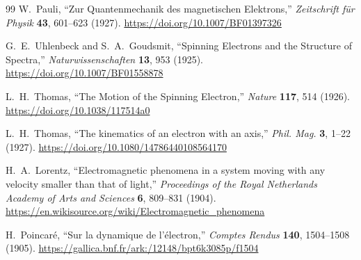 \documentclass[%
 reprint,
 amsmath,amssymb,
 aps,
]{revtex4-1}
\numberwithin{equation}{section}%
\begin{document}
\begin{thebibliography}{99}
W.~Pauli, 
``Zur Quantenmechanik des magnetischen Elektrons,'' 
\textit{Zeitschrift für Physik} \textbf{43}, 601--623 (1927).
\href{https://doi.org/10.1007/BF01397326}{https://doi.org/10.1007/BF01397326}

G.~E.~Uhlenbeck and S.~A.~Goudsmit, 
``Spinning Electrons and the Structure of Spectra,'' 
\textit{Naturwissenschaften} \textbf{13}, 953 (1925).
\href{https://doi.org/10.1007/BF01558878}{https://doi.org/10.1007/BF01558878}

L.~H.~Thomas, 
``The Motion of the Spinning Electron,'' 
\textit{Nature} \textbf{117}, 514 (1926).
\href{https://doi.org/10.1038/117514a0}{https://doi.org/10.1038/117514a0}

L.~H.~Thomas, 
``The kinematics of an electron with an axis,'' 
\textit{Phil. Mag.} \textbf{3}, 1--22 (1927). 
\href{https://doi.org/10.1080/14786440108564170}{https://doi.org/10.1080/14786440108564170}

H.~A.~Lorentz, 
``Electromagnetic phenomena in a system moving with any velocity smaller than that of light,'' 
\textit{Proceedings of the Royal Netherlands Academy of Arts and Sciences} \textbf{6}, 809--831 (1904).
\href{https://en.wikisource.org/wiki/Electromagnetic_phenomena}{https://en.wikisource.org/wiki/Electromagnetic\_phenomena}

H.~Poincaré, 
``Sur la dynamique de l'électron,'' 
\textit{Comptes Rendus} \textbf{140}, 1504--1508 (1905).
\href{https://gallica.bnf.fr/ark:/12148/bpt6k3085p/f1504}{https://gallica.bnf.fr/ark:/12148/bpt6k3085p/f1504}

\end{thebibliography}
\end{document}
